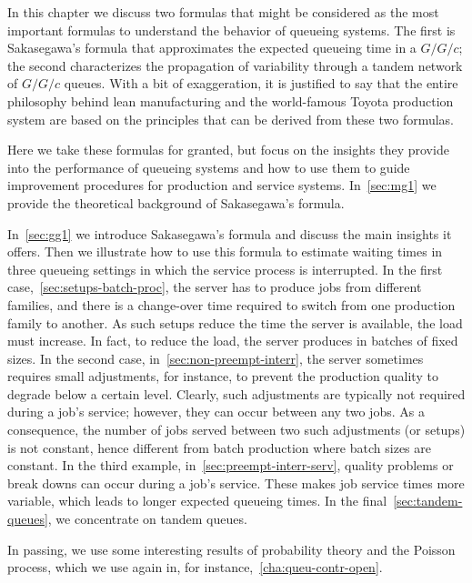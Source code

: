 In this chapter we discuss two formulas that might be considered as the most important formulas to understand the behavior of queueing systems.
The first is Sakasegawa's formula that approximates the expected queueing time in a $G/G/c$; the second characterizes the propagation of variability through a tandem network of $G/G/c$ queues.
With a bit of exaggeration, it is justified to say that the entire philosophy behind lean manufacturing and the world-famous Toyota production system are based on the principles that can be derived from these two formulas.

Here we take these formulas for granted, but focus on the insights they provide into the performance of queueing systems and how to use them to guide improvement procedures for production and service systems. In~\cref{sec:mg1} we provide the theoretical background of Sakasegawa's formula.


In~\cref{sec:gg1} we introduce Sakasegawa's formula and discuss the main insights it offers.
Then we illustrate how to use this formula to estimate waiting times in three queueing settings in which the service process is interrupted.
In the first case,~\cref{sec:setups-batch-proc}, the server has to produce jobs from different families, and there is a change-over time required to switch from one production family to another.
As such setups reduce the time the server is available, the load must increase.
In fact, to reduce the load, the server produces in batches of fixed sizes.
In the second case, in~\cref{sec:non-preempt-interr}, the server sometimes requires small adjustments, for instance, to prevent the production quality to degrade below a certain level.
Clearly, such adjustments are typically not required during a job's service; however, they can occur between any two jobs.
As a consequence, the number of jobs served between two such adjustments (or setups) is not constant, hence different from batch production where  batch sizes are constant.
In the third example, in~\cref{sec:preempt-interr-serv}, quality problems or break downs can occur during a job's service.
These makes job service times more variable, which leads to longer expected queueing times.
In the final~\cref{sec:tandem-queues}, we concentrate on tandem queues.

In passing, we use some interesting results of probability theory and the Poisson process, which we use again in, for instance,~\cref{cha:queu-contr-open}. 







